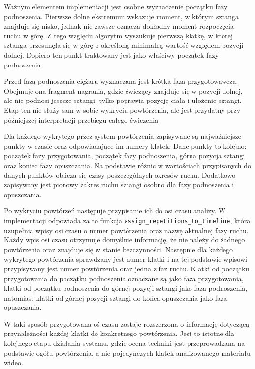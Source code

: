 Ważnym elementem implementacji jest osobne wyznaczenie początku fazy podnoszenia. Pierwsze dolne ekstremum wskazuje moment, w którym sztanga znajduje się nisko, jednak nie zawsze oznacza dokładny moment rozpoczęcia ruchu w górę. Z tego względu algorytm wyszukuje pierwszą klatkę, w której sztanga przesunęła się w górę o określoną minimalną wartość względem pozycji dolnej. Dopiero ten punkt traktowany jest jako właściwy początek fazy podnoszenia.

Przed fazą podnoszenia ciężaru wyznaczana jest krótka faza przygotowawcza. Obejmuje ona fragment nagrania, gdzie ćwiczący znajduje się w pozycji dolnej, ale nie podnosi jeszcze sztangi, tylko poprawia pozycję ciała i ułożenie sztangi. Etap ten nie służy sam w sobie wykryciu powtórzenia, ale jest przydatny przy późniejszej interpretacji przebiegu całego ćwiczenia.

Dla każdego wykrytego przez system powtórzenia zapisywane są najważniejsze punkty w czasie oraz odpowiadające im numery klatek. Dane punkty to kolejno: początek fazy przygotowania, początek fazy podnoszenia, górna pozycja sztangi oraz koniec fazy opuszczania. Na podstawie różnic w wartościach przypisanych do danych punktów oblicza się czasy poszczególnych okresów ruchu. Dodatkowo zapisywany jest pionowy zakres ruchu sztangi osobno dla fazy podnoszenia i opuszczania.

Po wykryciu powtórzeń następuje przypisanie ich do osi czasu analizy. W implementacji odpowiada za to funkcja \texttt{assign\_repetitions\_to\_timeline}, która uzupełnia wpisy osi czasu o numer powtórzenia oraz nazwę aktualnej fazy ruchu. Każdy wpis osi czasu otrzymuje domyślnie informację, że nie należy do żadnego powtórzenia oraz znajduje się w stanie bezczynności. Następnie dla każdego wykrytego powtórzenia sprawdzany jest numer klatki i na tej podstawie wpisowi przypisywany jest numer powtórzenia oraz jedna z faz ruchu. Klatki od początku przygotowania do początku podnoszenia oznaczane są jako faza przygotowania, klatki od początku podnoszenia do górnej pozycji sztangi jako faza podnoszenia, natomiast klatki od górnej pozycji sztangi do końca opuszczania jako faza opuszczania.

W taki sposób przygotowana oś czasu zostaje rozszerzona o informację dotyczącą przynależności każdej klatki do konkretnego powtórzenia. Jest to istotne dla kolejnego etapu działania systemu, gdzie ocena techniki jest przeprowadzana na podstawie ogółu powtórzenia, a nie pojedynczych klatek analizowanego materiału wideo.

